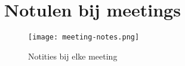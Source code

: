 \section{Notulen bij meetings}\label{appendix:meeting-notes}
\begin{figure}[hbt!]
  \centering
  \texttt{[image: meeting-notes.png]}
  \caption{Notities bij elke meeting}
  \label{fig:meeting-notes}
\end{figure}

\newpage